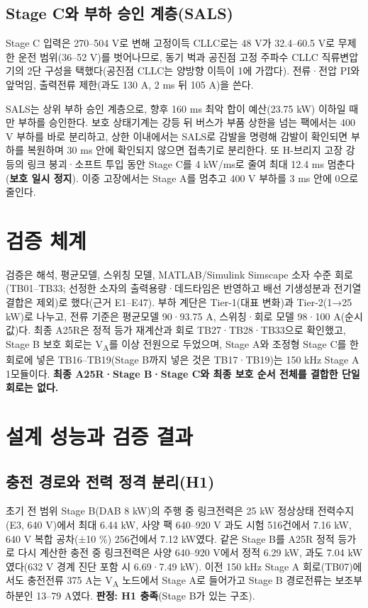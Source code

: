 \section{Stage C와 부하 승인 계층(SALS)}

Stage C 입력은 270–504 V로 변해 고정이득 CLLC로는 48 V가 32.4–60.5 V로 무제한 운전 범위(36–52 V)\cite{b10}를 벗어나므로, 동기 벅과 공진점 고정 주파수 CLLC 직류변압기의 2단 구성을 택했다(공진점 CLLC는 양방향 이득이 1에 가깝다\cite{b17}). 전류·전압 PI와 앞먹임, 출력전류 제한(과도 130 A, 2 ms 뒤 105 A)을 쓴다.

SALS는 상위 부하 승인 계층으로, 향후 160 ms 최악 합이 예산(23.75 kW) 이하일 때만 부하를 승인한다. 보호 상태기계는 강등 뒤 버스가 부품 상한을 넘는 팩에서는 400 V 부하를 바로 분리하고, 상한 이내에서는 SALS로 감발을 명령해 감발이 확인되면 부하를 복원하며 30 ms 안에 확인되지 않으면 접촉기로 분리한다. 또 H-브리지 고장 강등의 링크 붕괴·소프트 투입 동안 Stage C를 4 kW/ms로 줄여 최대 12.4 ms 멈춘다(\textbf{보호 일시 정지}). 이중 고장에서는 Stage A를 멈추고 400 V 부하를 3 ms 안에 0으로 줄인다.

\chapter{검증 체계}\label{s:method}

검증은 해석, 평균모델, 스위칭 모델, MATLAB/Simulink Simscape 소자 수준 회로(TB01–TB33; 선정한 소자의 출력용량·데드타임은 반영하고 배선 기생성분과 전기열 결합은 제외)로 했다(근거 E1–E47). 부하 계단은 Tier-1(대표 변화)과 Tier-2(1→25 kW)로 나누고, 전류 기준은 평균모델 90·93.75 A, 스위칭·회로 모델 98·100 A(순시값)다. 최종 A25R은 정적 등가 재계산과 회로 TB27·TB28·TB33으로 확인했고, Stage B 보호 회로는 V\textsubscript{A}를 이상 전원으로 두었으며, Stage A와 조정형 Stage C를 한 회로에 넣은 TB16–TB19(Stage B까지 넣은 것은 TB17·TB19)는 150 kHz Stage A 1모듈이다. \textbf{최종 A25R·Stage B·Stage C와 최종 보호 순서 전체를 결합한 단일 회로는 없다.}

\chapter{설계 성능과 검증 결과}

\section{충전 경로와 전력 정격 분리(H1)}

초기 전 범위 Stage B(DAB 8 kW)의 주행 중 링크전력은 25 kW 정상상태 전력수지(E3, 640 V)에서 최대 6.44 kW, 사양 팩 640–920 V 과도 시험 516건에서 7.16 kW, 640 V 복합 공차(±10 \%) 256건에서 7.12 kW였다. 같은 Stage B를 A25R 정적 등가로 다시 계산한 충전 중 링크전력은 사양 640–920 V에서 정적 6.29 kW, 과도 7.04 kW였다(632 V 경계 진단 포함 시 6.69·7.49 kW). 이전 150 kHz Stage A 회로(TB07)에서도 충전전류 375 A는 V\textsubscript{A} 노드에서 Stage A로 들어가고 Stage B 경로전류는 보조부하분인 13–79 A였다. \textbf{판정: H1 충족}(Stage B가 있는 구조).

